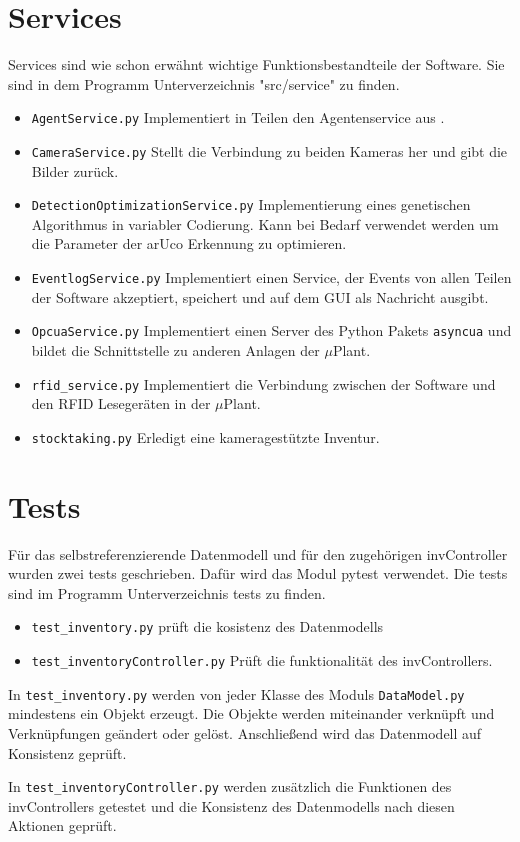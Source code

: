 \section*{Services}
Services sind wie schon erwähnt wichtige Funktionsbestandteile der Software. Sie sind in dem Programm Unterverzeichnis "src/service" zu finden.
\begin{itemize}
    \item \verb|AgentService.py| Implementiert in Teilen den Agentenservice aus \cite{LarsKistner2017}.
    \item \verb|CameraService.py| Stellt die Verbindung zu beiden Kameras her und gibt die Bilder zurück.
    \item \verb|DetectionOptimizationService.py| Implementierung eines genetischen Algorithmus in variabler Codierung. Kann bei Bedarf verwendet werden um die 
    Parameter der arUco Erkennung zu optimieren. 
    \item \verb|EventlogService.py| Implementiert einen Service, der Events von allen Teilen der Software akzeptiert, speichert und auf dem GUI als Nachricht ausgibt. 
    \item \verb|OpcuaService.py| Implementiert einen Server des Python Pakets \verb|asyncua| \cite{asyncua} und bildet die Schnittstelle zu anderen Anlagen der $\mu$Plant. 
    \item \verb|rfid_service.py| Implementiert die Verbindung zwischen der Software und den RFID Lesegeräten in der $\mu$Plant. 
    \item \verb|stocktaking.py| Erledigt eine kameragestützte Inventur. 
\end{itemize}

\section*{Tests}
Für das selbstreferenzierende Datenmodell und für den zugehörigen \glqq invController \grqq  wurden zwei tests geschrieben. 
Dafür wird das Modul \glqq pytest \grqq verwendet. Die tests sind im Programm Unterverzeichnis \glqq tests \grqq zu finden. 
\begin{itemize}
    \item \verb|test_inventory.py| prüft die kosistenz des Datenmodells
    \item \verb|test_inventoryController.py| Prüft die funktionalität des invControllers.
\end{itemize} 
In \verb|test_inventory.py| werden von jeder Klasse des Moduls \verb|DataModel.py| mindestens ein Objekt erzeugt. 
Die Objekte werden miteinander verknüpft und Verknüpfungen geändert oder gelöst. Anschließend wird das Datenmodell auf Konsistenz geprüft. 

In \verb|test_inventoryController.py| werden zusätzlich die Funktionen des invControllers getestet und die Konsistenz des
Datenmodells nach diesen Aktionen geprüft. 
